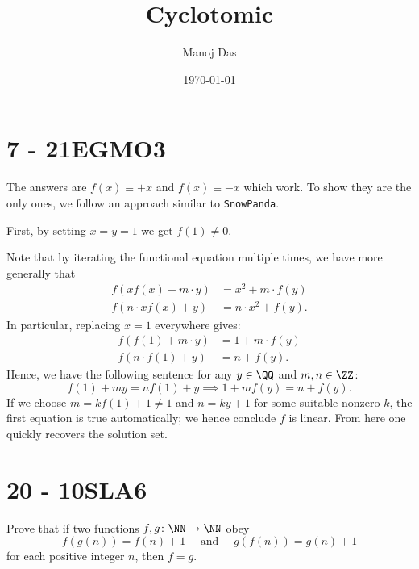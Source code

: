 \documentclass[11pt,twoside]{scrartcl}
\begin{document}
\title{Cyclotomic}


\author{Manoj Das}
\date{\today}
\section{7 - 21EGMO3}

\begin{soln}
    The answers are $f(x) \equiv +x$
and $f(x) \equiv -x$ which work.
To show they are the only ones,
we follow an approach similar to \texttt{SnowPanda}.

First, by setting $x=y=1$ we get $\boxed{f(1) \neq 0}$.

Note that by iterating the functional equation
multiple times, we have more generally that
\begin{align*}
	f(xf(x) + m \cdot y) &= x^2 + m \cdot f(y) \\
	f(n \cdot xf(x) + y) &= n \cdot x^2 + f(y).
\end{align*}
In particular, replacing $x=1$ everywhere gives:
\begin{align*}
	f(f(1) + m \cdot y) &= 1 + m \cdot f(y) \\
	f(n \cdot f(1) + y) &= n + f(y).
\end{align*}
Hence, we have the following sentence for any $y \in \QQ$
and $m,n \in \ZZ$:
\[ f(1) + my = n f(1) + y \implies 1 + mf(y) = n + f(y). \]
If we choose $m = kf(1)+1 \neq 1$ and $n = ky+1$
for some suitable nonzero $k$,
the first equation is true automatically;
we hence conclude $f$ is linear.
From here one quickly recovers the solution set.

\end{soln}
\section{20 - 10SLA6}

    \begin{problem}[Shortlist 2010 A6]
        Prove that if two functions $f, g \colon \NN \to \NN$
        obey
        \[ f(g(n)) = f(n)+1 \quad\text{ and }\quad g(f(n)) = g(n)+1 \]
        for each positive integer $n$, then $f = g$.
    \end{problem}
\end{document}
